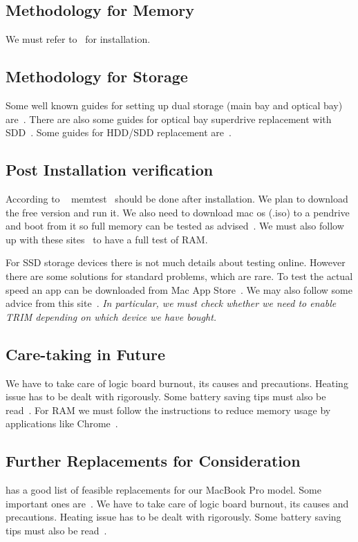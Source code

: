\subsection{Methodology for Memory}
\label{memoryMethodology}
We must refer to~\cite{ifixramreguide,owcramvid,youramvid} for installation. 

\subsection{Methodology for Storage}
\label{storageMethodology}
Some well known guides for setting up dual storage (main bay and optical bay) are~\cite{owcdualrep, youowcdualrep,ifixitdualrep}. There are also some guides for optical bay superdrive replacement with SDD~\cite{ifixitopsdrep,djttopsdrep}. Some guides for HDD/SDD replacement are~\cite{owchdsdrep,ifixithdsdrep}. 


\subsection{Post Installation verification}
\label{postInstallVerification}
According to ~\cite{macrumourramtest} memtest~\cite{memtest} should be done after installation. We plan to download the free version and run it. We also need to download mac os (.iso) to a pendrive and boot from it so full memory can be tested as advised~\cite{macrumourramtest}. We must also follow up with these sites~\cite{macworldramtest,turboframtest} to have a full test of RAM.

For SSD storage devices there is not much details about testing online. However there are some solutions for standard problems, which are rare. To test the actual speed an app can be downloaded from Mac App Store~\cite{itunesssdtest}. We may also follow some advice from this site~\cite{machowtotest}. \emph{In particular, we must check whether we need to enable TRIM depending on which device we have bought.}

\subsection{Care-taking in Future}
\label{caretaking}
 We have to take care of logic board burnout, its causes and precautions. Heating issue has to be dealt with rigorously. Some battery saving tips must also be read~\cite{owcsavebattery}. For RAM we must follow the instructions to reduce memory usage by applications like Chrome~\cite{zdnetchromeram}.

\subsection{Further Replacements for Consideration}
\label{futureConsideration}
\cite{ifixallguides} has a good list of feasible replacements for our MacBook Pro model. Some important ones are~\cite{ifixheatsinkguide, ifixlogicbdguide}. We have to take care of logic board burnout, its causes and precautions. Heating issue has to be dealt with rigorously. Some battery saving tips must also be read~\cite{owcsavebattery}.
